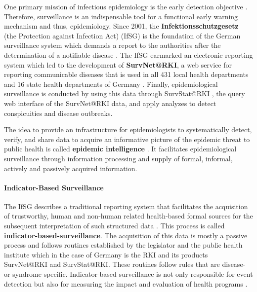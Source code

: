   One primary mission of infectious epidemiology is the early detection objective \citep{EarlyDetection}.
  Therefore, surveillance is an indispensable tool for a functional early warning mechanism and thus, epidemiology.
  Since 2001, the \textbf{Infektionsschutzgesetz} (the Protection against Infection Act) (\gls{IfSG})
  is the foundation of the German surveillance system which demands a report to the authorities after the determination of a notifiable disease \citep{IfSG}.
  The IfSG earmarked an electronic reporting system which led to the development of \textbf{SurvNet@RKI}, a web service for reporting communicable diseases that is used in all 431 local health departments and 16 state health departments of Germany \citep{Faensen2006}.
  Finally, epidemiological surveillance is conducted by using this data through SurvStat@RKI \citep{Faensen2004}, the query web interface of the SurvNet@RKI data, and apply analyzes to detect conspicuities and disease outbreaks.

  The idea to provide an infrastructure for epidemiologists to systematically detect, verify, and share data to acquire an informative picture of the epidemic threat to public health is called \textbf{epidemic intelligence} \citep{EarlyDetection}.
  It facilitates epidemiological surveillance through information processing and supply of formal, informal, actively and passively acquired information.

\paragraph{Indicator-Based Surveillance}
  The IfSG describes a traditional reporting system that facilitates the acquisition of trustworthy, human and non-human related health-based formal sources for the subsequent interpretation of such structured data \citep{EarlyDetection}.
  This process is called \textbf{indicator-based-surveillance}.
  The acquisition of this data is mostly a passive process and follows routines established by the legislator and the public health institute which in the case of Germany is the RKI and its products SurvNet@RKI and SurvStat@RKI.
  These routines follow rules that are disease- or syndrome-specific.
  Indicator-based surveillance is not only responsible for event detection but also for measuring the impact and evaluation of health programs \citep{EarlyDetection}.

